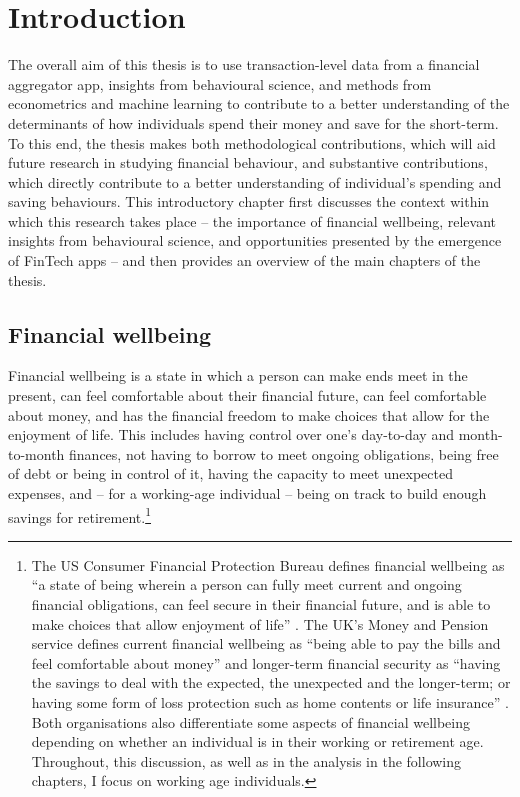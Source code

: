
\chapter{Introduction}%
\label{cha:introduction}

The overall aim of this thesis is to use transaction-level data from a
financial aggregator app, insights from behavioural science, and methods from
econometrics and machine learning to contribute to a better understanding of
the determinants of how individuals spend their money and save for the
short-term. {\color{blue} To this end, the thesis makes both methodological contributions, which will aid future research in studying financial behaviour, and substantive contributions, which directly contribute to a better understanding of individual's spending and saving behaviours.} This introductory chapter first discusses the context within which
this research takes place -- the importance of financial wellbeing, relevant
insights from behavioural science, and opportunities presented by the emergence
of FinTech apps -- and then provides an overview of the main chapters of the
thesis.

\section{Financial wellbeing}%

Financial wellbeing is a state in which a person can make ends meet in the
present, can feel comfortable about their financial future, can feel
comfortable about money, and has the financial freedom to make choices that
allow for the enjoyment of life. This includes having control over one's
day-to-day and month-to-month finances, not having to borrow to meet
ongoing obligations, being free of debt or being in control of it, having the
capacity to meet unexpected expenses, and -- for a working-age individual --
being on track to build enough savings for retirement.\footnote{The US Consumer
    Financial Protection Bureau defines financial wellbeing as ``a state of
    being wherein a person can fully meet current and ongoing financial
    obligations, can feel secure in their financial future, and is able to make
    choices that allow enjoyment of life'' \citep{cfpb2015financial}. The UK's
    Money and Pension service defines current financial wellbeing as ``being
    able to pay the bills and feel comfortable about money'' and longer-term
    financial security as ``having the savings to deal with the expected, the
    unexpected and the longer-term; or having some form of loss protection such
    as home contents or life insurance'' \citep{mps2018building}. Both
    organisations also differentiate some aspects of financial wellbeing
    depending on whether an individual is in their working or retirement age.
Throughout, this discussion, as well as in the analysis in the following
chapters, I focus on working age individuals.}

